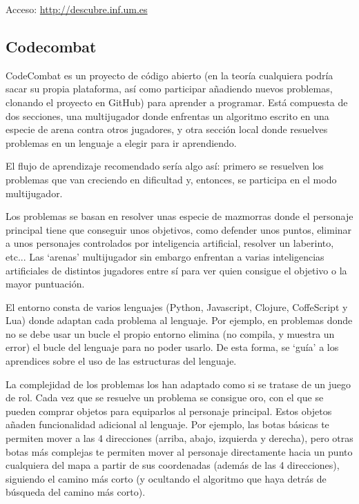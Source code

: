 \documentclass{report}
\begin{document}
	
	\vspace{10px}
	
	Acceso: \url{http://descubre.inf.um.es}
	
	\subsection{Codecombat}
	
	CodeCombat es un proyecto de código abierto (en la teoría cualquiera podría sacar su propia plataforma, así como participar añadiendo nuevos problemas, clonando el proyecto en GitHub) para aprender a programar. Está compuesta de dos secciones, una multijugador donde enfrentas un algoritmo escrito en una especie de arena contra otros jugadores, y otra sección local donde resuelves problemas en un lenguaje a elegir para ir aprendiendo.
	
	\vspace{10px}
	
	El flujo de aprendizaje recomendado sería algo así: primero se resuelven los problemas que van creciendo en dificultad y, entonces, se participa en el modo multijugador. 
	
	\vspace{10px}
	
	Los problemas se basan en resolver unas especie de mazmorras donde el personaje principal tiene que conseguir unos objetivos, como defender unos puntos, eliminar a unos personajes controlados por inteligencia artificial, resolver un laberinto, etc... Las `arenas' multijugador sin embargo enfrentan a varias inteligencias artificiales de distintos jugadores entre sí para ver quien consigue el objetivo o la mayor puntuación.
	
	\vspace{10px}
	
	El entorno consta de varios lenguajes (Python, Javascript, Clojure, CoffeScript y Lua) donde adaptan cada problema al lenguaje. Por ejemplo, en problemas donde no se debe usar un bucle el propio entorno elimina (no compila, y muestra un error) el bucle del lenguaje para no poder usarlo. De esta forma, se `guía' a los aprendices sobre el uso de las estructuras del lenguaje.
	
	\vspace{10px}
	
	La complejidad de los problemas los han adaptado como si se tratase de un juego de rol. Cada vez que se resuelve un problema se consigue oro, con el que se pueden comprar objetos para equiparlos al personaje principal. Estos objetos añaden funcionalidad adicional al lenguaje. Por ejemplo, las botas básicas te permiten mover a las 4 direcciones (arriba, abajo, izquierda y derecha), pero otras botas más complejas te permiten mover al personaje directamente hacia un punto cualquiera del mapa a partir de sus coordenadas (además de las 4 direcciones), siguiendo el camino más corto (y ocultando el algoritmo que haya detrás de búsqueda del camino más corto).
	
\end{document}
